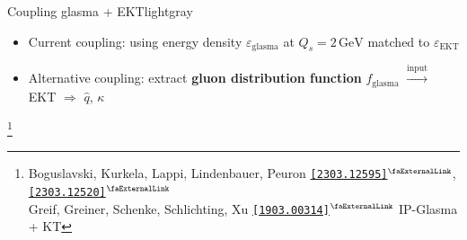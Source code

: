 \documentclass[aspectratio=169,11pt,usenames,dvipsnames]{beamer}
\renewcommand{\thefootnote}{\color{customblue}\faPaperPlaneO}
\newcommand\blfootnote[1]{%
  \begingroup
  \renewcommand\thefootnote{}\footnote{#1}%
  \addtocounter{footnote}{-1}%
  \endgroup
}
\begin{document}
\begin{frame}
\begin{center}
\begin{columns}
        \end{columns}
    \end{center}
    \vspace{-10pt}
   \begin{center}
    \begin{custombox2}{Coupling glasma + EKT}{lightgray}
        \small
        \begin{varwidth}{0.9\textwidth}
        \begin{itemize}\itemsep0em 
            \item Current coupling: using energy density $\varepsilon_\mathrm{glasma}$ at $Q_s=2\,\mathrm{GeV}$ matched to $\varepsilon_\mathrm{EKT}$ 
            \item Alternative coupling: extract {\bfseries\color{palgold} gluon distribution function} $f_{\mathrm{glasma}}$ $\xrightarrow{\text{input}}$ EKT $\Rightarrow$ $\hat{q}$, $\kappa$
        \end{itemize}
        \end{varwidth}
    \end{custombox2}
   \end{center} 
   \vspace{-5pt}
    \blfootnote{\scriptsize Boguslavski, Kurkela, Lappi, Lindenbauer, Peuron \href{https://arxiv.org/abs/2303.12595}{{\color{palgold}\texttt{[2303.12595]}$^\text{\scalebox{0.9}{\faExternalLink}}$}}, \href{https://arxiv.org/abs/2303.12520}{{\color{palgold}\texttt{[2303.12520]}$^\text{\scalebox{0.9}{\faExternalLink}}$}}\\
    \hspace{16.5pt}Greif, Greiner, Schenke, Schlichting, Xu \href{https://arxiv.org/abs/1903.00314}{{\color{palviolet}\texttt{[1903.00314]}$^\text{\scalebox{0.9}{\faExternalLink}}$}} IP-Glasma + KT}
\end{frame}


\end{document}
